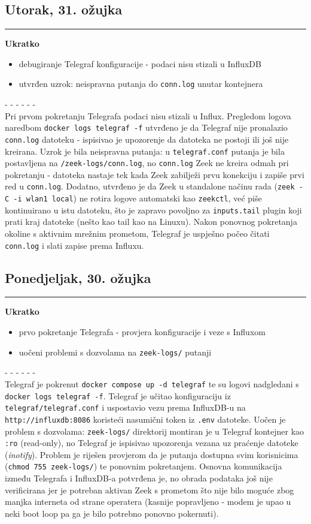 \documentclass[12pt, a4paper]{article}
\newcommand{\dan}[1]{
    \subsection*{#1}
    \vspace{-0.5em} 
    \hrule \vspace{0.5em} 
}
\begin{document}
\dan{Utorak, 31. ožujka}
\textbf{Ukratko}
\begin{itemize}
    \item debugiranje Telegraf konfiguracije - podaci nisu stizali u InfluxDB
    \item utvrđen uzrok: neispravna putanja do \lstinline|conn.log| unutar kontejnera
\end{itemize}
- - - - - - \\
Pri prvom pokretanju Telegrafa podaci nisu stizali u Influx.
Pregledom logova naredbom \lstinline|docker logs telegraf -f| utvrđeno je da Telegraf
nije pronalazio \lstinline|conn.log| datoteku - ispisivao je upozorenje da datoteka
ne postoji ili još nije kreirana.
Uzrok je bila neispravna putanja: u \lstinline|telegraf.conf| putanja je bila postavljena
na \lstinline|/zeek-logs/conn.log|, no \lstinline|conn.log| Zeek ne kreira odmah pri pokretanju
- datoteka nastaje tek kada Zeek zabilježi prvu konekciju i zapiše prvi red u \lstinline|conn.log|.
Dodatno, utvrđeno je da Zeek u standalone načinu rada (\lstinline|zeek -C -i wlan1 local|)
ne rotira logove automatski kao \lstinline|zeekctl|, već piše kontinuirano u istu datoteku,
što je zapravo povoljno za \lstinline|inputs.tail| plugin koji prati kraj datoteke (nešto kao tail kao na Linuxu).
Nakon ponovnog pokretanja okoline s aktivnim mrežnim prometom, Telegraf je uspješno
počeo čitati \lstinline|conn.log| i slati zapise prema Influxu.

\dan{Ponedjeljak, 30. ožujka}
\textbf{Ukratko}
\begin{itemize}
    \item prvo pokretanje Telegrafa - provjera konfiguracije i veze s Influxom
    \item uočeni problemi s dozvolama na \lstinline|zeek-logs/| putanji
\end{itemize}
- - - - - - \\
Telegraf je pokrenut \lstinline|docker compose up -d telegraf|
te su logovi nadgledani s \lstinline|docker logs telegraf -f|.
Telegraf je učitao konfiguraciju iz \lstinline|telegraf/telegraf.conf| i uspostavio
vezu prema InfluxDB-u na \lstinline|http://influxdb:8086| koristeći nasumični token iz
\lstinline|.env| datoteke.
Uočen je problem s dozvolama: \lstinline|zeek-logs/| direktorij montiran je u Telegraf
kontejner kao \lstinline|:ro| (read-only), no Telegraf je ispisivao upozorenja vezana uz
praćenje datoteke (\textit{inotify}).
Problem je riješen provjerom da je putanja dostupna svim korisnicima
(\lstinline|chmod 755 zeek-logs/|) te ponovnim pokretanjem.
Osnovna komunikacija između Telegrafa i InfluxDB-a potvrđena je, no obrada podataka
još nije verificirana jer je potreban aktivan Zeek s prometom što nije bilo moguće zbog
manjka interneta od strane operatera (kasnije popravljeno - modem je upao u neki boot loop pa ga
je bilo potrebno ponovno pokernuti).
\end{document}
